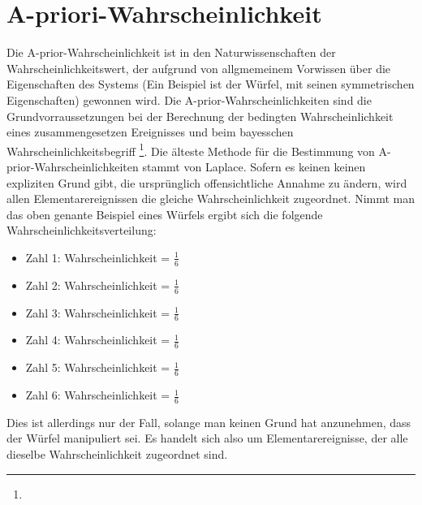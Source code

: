 \chapter{A-priori-Wahrscheinlichkeit}

Die A-prior-Wahrscheinlichkeit ist in den Naturwissenschaften der Wahrscheinlichkeitswert, der aufgrund von allgmemeinem Vorwissen über die Eigenschaften des Systems
(Ein Beispiel ist der Würfel, mit seinen symmetrischen Eigenschaften) gewonnen wird. Die A-prior-Wahrscheinlichkeiten sind die Grundvorraussetzungen
bei der Berechnung der bedingten Wahrscheinlichkeit eines zusammengesetzen Ereignisses und beim bayesschen Wahrscheinlichkeitsbegriff \footnote[1]{}.
Die älteste Methode für die Bestimmung von A-prior-Wahrscheinlichkeiten stammt von Laplace. Sofern es keinen keinen expliziten Grund gibt, die ursprünglich
offensichtliche Annahme zu ändern, wird allen Elementarereignissen die gleiche Wahrscheinlichkeit zugeordnet. \cite[S. 80f]{Pap:1995}
Nimmt man das oben genante Beispiel eines Würfels ergibt sich die folgende Wahrscheinlichkeitsverteilung:

\begin{itemize} 
    \item Zahl 1: Wahrscheinlichkeit = $\frac{1}{6}$
    \item Zahl 2: Wahrscheinlichkeit = $\frac{1}{6}$
    \item Zahl 3: Wahrscheinlichkeit = $\frac{1}{6}$
    \item Zahl 4: Wahrscheinlichkeit = $\frac{1}{6}$
    \item Zahl 5: Wahrscheinlichkeit = $\frac{1}{6}$
    \item Zahl 6: Wahrscheinlichkeit = $\frac{1}{6}$
\end{itemize}

Dies ist allerdings nur der Fall, solange man keinen Grund hat anzunehmen, dass der Würfel manipuliert sei. Es handelt sich also um Elementarereignisse, der
alle dieselbe Wahrscheinlichkeit zugeordnet sind.